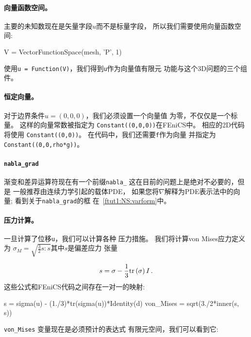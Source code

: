 
\paragraph{向量函数空间。}

主要的未知数现在是矢量字段$u$而不是标量字段，
所以我们需要使用向量函数空间:

\begin{python}
V = VectorFunctionSpace(mesh, 'P', 1)
\end{python}
使用\texttt{u = Function(V)}，我们得到\texttt{u}作为向量值有限元
功能与这个3D问题的三个组件。

\paragraph{恒定向量。}
对于边界条件$u=(0,0,0)$，我们必须设置一个向量值
为零，不仅仅是一个标量。 这样的向量常数被指定为
\texttt{Constant((0,0,0))}在FEniCS中。 相应的2D代码将使用
\texttt{Constant((0,0))}。 在代码中，我们还需要\texttt{f}作为向量
并指定为\texttt{Constant((0,0,rho*g))}。

\paragraph{\texttt{nabla\_grad}}

渐变和差异运算符现在有一个前缀\verb!nabla_!
这在目前的问题上是绝对不必要的，但是
一般推荐由连续力学引起的载体PDE，
如果您将$\nabla$解释为PDE表示法中的向量;
看到关于\verb!nabla_grad!的框 在~\ref{ftut1:NS:varform}中。

\paragraph{压力计算。}
一旦计算了位移\texttt{u}，我们可以计算各种
压力措施。 我们将计算von Mises应力定义为
$\sigma_M = \sqrt{\frac{3}{2}s:s}$其中$s$是偏差应力
张量

\[ s = \sigma - \frac{1}{3}\mathrm{tr}\,(\sigma)\,I\thinspace .\]
这些公式和FEniCS代码之间存在一对一的映射:

\begin{python}
s = sigma(u) - (1./3)*tr(sigma(u))*Identity(d)
von_Mises = sqrt(3./2*inner(s, s))
\end{python}
\verb!von_Mises! 变量现在是必须预计的表达式
有限元空间，我们可以看到它:

